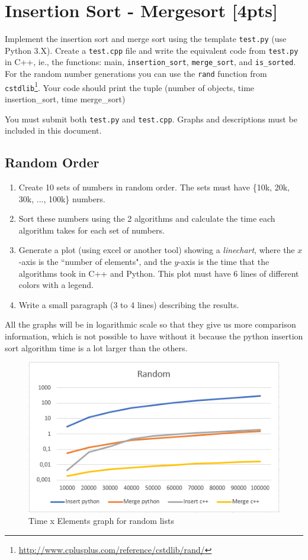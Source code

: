 \documentclass{article}
\begin{document}
\section{Insertion Sort - Mergesort [4pts]}
Implement the insertion sort and merge sort using the template \texttt{test.py} (use Python 3.X). Create a \texttt{test.cpp} file and write the equivalent code from \texttt{test.py} in C++, ie., the functions: main, \texttt{insertion\_sort}, \texttt{merge\_sort}, and \texttt{is\_sorted}. For the random number generations you can use the \texttt{rand} function from \texttt{cstdlib}\footnote{\url{http://www.cplusplus.com/reference/cstdlib/rand/}}. Your code should print the tuple (number of objects, time insertion\_sort, time merge\_sort)

You must submit both \texttt{test.py} and \texttt{test.cpp}. Graphs and descriptions must be included in this document. 

\subsection{Random Order}
\begin{enumerate}
  \item Create 10 sets of numbers in random order. The sets must have \{10k, 20k, 30k, ..., 100k\} numbers.
  
  \item Sort these numbers using the 2 algorithms and calculate the time each algorithm takes for each set of numbers.
  
  \item Generate a plot (using excel or another tool) showing a \emph{linechart}, where the $x$-axis is the ``number of elements", and the $y$-axis is the time that the algorithms took in C++ and Python. This plot must have 6 lines of different colors with a legend.
  
  \item Write a small paragraph (3 to 4 lines) describing the results.
  
\end{enumerate}

All the graphs will be in logarithmic scale so that they give us more comparison information, which is not possible to have without it because the python insertion sort algorithm time is a lot larger than the others.


\begin{figure}[H]
  \centering
  \includegraphics[width=0.7\linewidth]{Random.PNG}
  \caption{Time x Elements graph for random lists}
  \label{fig:boat1}
\end{figure}
\end{document}
